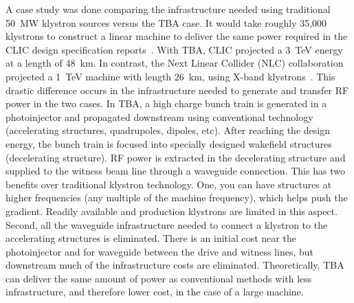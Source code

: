 A case study was done comparing the infrastructure 
needed using traditional \SI{50}{MW} klystron sources versus the TBA case.
It would take roughly 35,000 klystrons to construct a linear machine to deliver the same 
power required in the CLIC design specification reports~\cite{CLICdesignReport}. 
With TBA, CLIC projected a \SI{3}{TeV} energy at a length of \SI{48}{km}.
In contrast, the Next Linear Collider (NLC) collaboration projected a \SI{1}{TeV} machine 
with length \SI{26}{km}, using X-band klystrons~\cite{NLC}. 
This drastic difference occurs in the infrastructure needed to generate and transfer
RF power in the two cases. In TBA, a high charge bunch train is generated in 
a photoinjector and propagated downstream using conventional technology 
(accelerating structures, quadrupoles, dipoles, etc). After reaching the design energy,
the bunch train is focused into specially designed wakefield structures (decelerating structure).
RF power is extracted in the decelerating structure and supplied to the witness 
beam line through a waveguide connection. This has two benefits over traditional klystron technology.
One, you can have structures at higher frequencies (any multiple of the machine frequency), 
which helps push the gradient. Readily available and production klystrons are limited in this aspect.
Second, all the waveguide infrastructure needed to connect a klystron to the accelerating 
structures is eliminated. There is an initial cost near the photoinjector 
and for waveguide between the drive and witness lines, 
but downstream much of the infrastructure costs are eliminated.
Theoretically, TBA can deliver the same amount of power as conventional methods with less 
infrastructure, and therefore lower cost, in the case of a large machine. 

